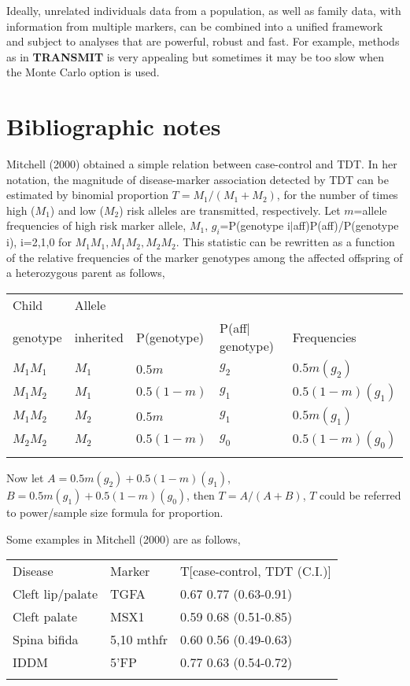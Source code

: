 Ideally, unrelated individuals data from a population, as well as family data,
with information from multiple markers, can be combined into a unified
framework and subject to analyses that are powerful, robust and fast.  For
example, methods as in {\bf TRANSMIT} is very appealing but sometimes it may be
too slow when the Monte Carlo option is used.


\section{Bibliographic notes}

Mitchell (2000) obtained a simple relation between case-control and TDT.  In
her notation, the magnitude of disease-marker association detected by TDT can
be estimated by binomial proportion $T=M_1/(M_1+M_2)$, for the number of times
high ($M_1$) and low ($M_2$) risk alleles are transmitted, respectively.  Let
$m$=allele frequencies of high risk marker allele, $M_1$, $g_i$=P(genotype
i$|$aff)P(aff)/P(genotype i), i=2,1,0 for $M_1M_1,M_1M_2,M_2M_2$.  This
statistic can be rewritten as a function of the relative frequencies of the
marker genotypes among the affected offspring of a heterozygous parent as
follows,

\begin{tabular}{lllll}
\\
Child   &Allele\\
genotype&inherited &   P(genotype)   &P(aff$|$genotype) & Frequencies\\
$M_1M_1$ &   $M_1$ &     $0.5m    $  & $g_2$          & $0.5m(g_2)$\\
$M_1M_2$ &   $M_1$ &     $0.5(1-m)$  & $g_1$          & $0.5(1-m)(g_1)$\\
$M_1M_2$ &   $M_2$ &     $0.5m    $  & $g_1$          & $0.5m(g_1)$\\
$M_2M_2$ &   $M_2$ &     $0.5(1-m)$  & $g_0$          & $0.5(1-m)(g_0)$\\
\\
\end{tabular}

Now let
$A=0.5m(g_2)+0.5(1-m)(g_1)$,
$B=0.5m(g_1)+0.5(1-m)(g_0)$,
then $T=A/(A+B)$, $T$ could be referred to power/sample size formula for
proportion.

Some examples in Mitchell (2000) are as follows,

\begin{tabular}{lll}
\\
Disease           & Marker    &T[case-control, TDT (C.I.)]\\
Cleft lip/palate  & TGFA      &0.67  0.77 (0.63-0.91)\\
Cleft palate      & MSX1      &0.59  0.68 (0.51-0.85)\\
Spina bifida      & 5,10 mthfr&0.60  0.56 (0.49-0.63)\\
IDDM              & 5'FP      &0.77  0.63 (0.54-0.72)\\
\\
\end{tabular}

